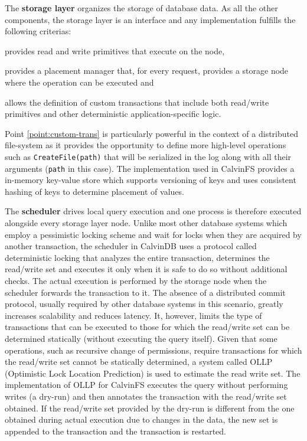 The \textbf{storage layer} organizes the storage of database data.
As all the other components, the storage layer is an interface and any implementation fulfills the following criterias: 
\begin{inparaenum}[i)]
    \item provides read and write primitives that execute on the node,
    \item provides a placement manager that, for every request, provides a storage node where the operation can be executed and
    \item \label{point:custom-trans} allows the definition of custom transactions that include both read/write primitives and other deterministic application-specific logic.
\end{inparaenum}
Point \ref{point:custom-trans} is particularly powerful in the context of a distributed file-system as it provides the opportunity to define more high-level operations such as \texttt{CreateFile(path)} that will be serialized in the log along with all their arguments (\texttt{path} in this case).
The implementation used in CalvinFS provides a in-memory key-value store which supports versioning of keys and uses consistent hashing of keys to determine placement of values.

The \textbf{scheduler} drives local query execution and one process is therefore executed alongside every storage layer node.
Unlike most other database systems which employ a pessimistic locking scheme and wait for locks when they are acquired by another transaction, the scheduler in CalvinDB uses a protocol called deterministic locking that analyzes the entire transaction, determines the read/write set and executes it only when it is safe to do so without additional checks.
The actual execution is performed by the storage node when the scheduler forwards the transaction to it.
The absence of a distributed commit protocol, usually required by other database systems in this scenario, greatly increases scalability and reduces latency.
It, however, limits the type of transactions that can be executed to those for which the read/write set can be determined statically (without executing the query itself).
Given that some operations, such as recursive change of permissions, require transactions for which the read/write set cannot be statically determined, a system called OLLP (Optimistic Lock Location Prediction) is used to estimate the read write set.
The implementation of OLLP for CalvinFS executes the query without performing writes (a dry-run) and then annotates the transaction with the read/write set obtained.
If the read/write set provided by the dry-run is different from the one obtained during actual execution due to changes in the data, the new set is appended to the transaction and the transaction is restarted.


